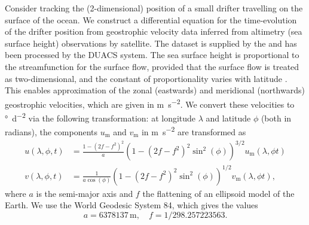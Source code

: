 Consider tracking the (2-dimensional) position of a small drifter travelling on the surface of the ocean.
We construct a differential equation for the time-evolution of the drifter position from geostrophic velocity data inferred from altimetry (sea surface height) observations by satellite.
The dataset is supplied by the \citet{E.U.CopernicusMarineServiceCMEMS_2020_GlobalOceanGridded} and has been processed by the DUACS system.
The sea surface height is proportional to the streamfunction for the surface flow, provided that the surface flow is treated as two-dimensional, and the constant of proportionality varies with latitude \citet{Park_2004_DeterminationSurfaceGeostrophic,DoglioniEtAl_2021_SeaSurfaceHeight}.
This enables approximation of the zonal (eastwards) and meridional (northwards) geostrophic velocities, which are given in \unit{\metre\per\square\second}.
We convert these velocities to \unit{\degree\per\square\day} via the following transformation: at longitude \(\lambda\) and latitude \(\phi\) (both in radians), the components \(u_{\mathrm{m}}\) and \(v_{\mathrm{m}}\) in \unit{\metre\per\square\second} are transformed as \citep{Capderou_2014_HandbookSatelliteOrbits}
\begin{align*}
	u\!\left(\lambda, \phi, t\right) & = \frac{1 - \left(2f - f^2\right)^2}{a}\left(1 - \left(2f - f^2\right)^2\sin^2\!\left(\phi\right)\right)^{3/2} u_{\mathrm{m}}\!\left(\lambda, \phi t\right) \\
	v\!\left(\lambda, \phi, t\right) & = \frac{1}{a\cos\!\left(\phi\right)}\left(1 - \left(2f - f^2\right)^2\sin^2\!\left(\phi\right)\right)^{1/2} v_{\mathrm{m}}\!\left(\lambda, \phi t\right),
\end{align*}
where \(a\) is the semi-major axis and \(f\) the flattening of an ellipsoid model of the Earth.
We use the World Geodesic System 84, which gives the values \citep{Capderou_2014_HandbookSatelliteOrbits}
\[
	a = 6378137\,\unit{\metre}, \quad f = 1 / 298.257223563.
\]

